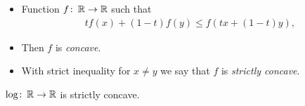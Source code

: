 \begin{frame}
  \begin{definition}
    \begin{itemize}
      \item Function \(f\colon \operatorname{\mathbb{R}}\to \operatorname{\mathbb{R}}\) such that
        \begin{align*}
          tf(x) + (1-t)f(y) \leq f(tx + (1-t)y),
        \end{align*}

      \item Then \(f\) is \emph{concave}.
      \item With strict inequality for \(x\neq y\) we say that \(f\) is 
        \emph{strictly concave}.
    \end{itemize}
  \end{definition}

  \begin{example}
    \(\log\colon \operatorname{\mathbb{R}}\to \operatorname{\mathbb{R}}\) is strictly concave.
  \end{example}
\end{frame}

\begin{frame}[fragile]
\end{frame}

%
%

